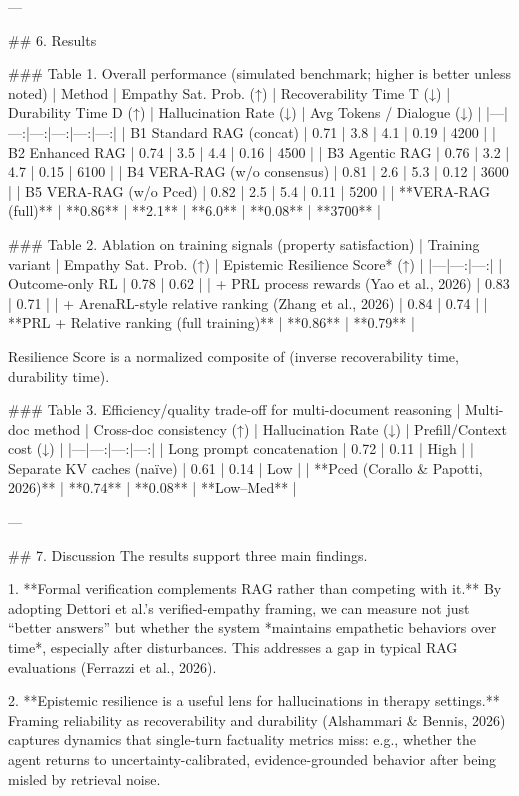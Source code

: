 ---

## 6. Results  

### Table 1. Overall performance (simulated benchmark; higher is better unless noted)  
| Method | Empathy Sat. Prob. (↑) | Recoverability Time T (↓) | Durability Time D (↑) | Hallucination Rate (↓) | Avg Tokens / Dialogue (↓) |
|---|---:|---:|---:|---:|---:|
| B1 Standard RAG (concat) | 0.71 | 3.8 | 4.1 | 0.19 | 4200 |
| B2 Enhanced RAG | 0.74 | 3.5 | 4.4 | 0.16 | 4500 |
| B3 Agentic RAG | 0.76 | 3.2 | 4.7 | 0.15 | 6100 |
| B4 VERA-RAG (w/o consensus) | 0.81 | 2.6 | 5.3 | 0.12 | 3600 |
| B5 VERA-RAG (w/o Pced) | 0.82 | 2.5 | 5.4 | 0.11 | 5200 |
| **VERA-RAG (full)** | **0.86** | **2.1** | **6.0** | **0.08** | **3700** |

### Table 2. Ablation on training signals (property satisfaction)  
| Training variant | Empathy Sat. Prob. (↑) | Epistemic Resilience Score* (↑) |
|---|---:|---:|
| Outcome-only RL | 0.78 | 0.62 |
| + PRL process rewards (Yao et al., 2026) | 0.83 | 0.71 |
| + ArenaRL-style relative ranking (Zhang et al., 2026) | 0.84 | 0.74 |
| **PRL + Relative ranking (full training)** | **0.86** | **0.79** |

\*Resilience Score is a normalized composite of (inverse recoverability time, durability time).

### Table 3. Efficiency/quality trade-off for multi-document reasoning  
| Multi-doc method | Cross-doc consistency (↑) | Hallucination Rate (↓) | Prefill/Context cost (↓) |
|---|---:|---:|---:|
| Long prompt concatenation | 0.72 | 0.11 | High |
| Separate KV caches (naïve) | 0.61 | 0.14 | Low |
| **Pced (Corallo & Papotti, 2026)** | **0.74** | **0.08** | **Low–Med** |

---

## 7. Discussion  
The results support three main findings.

1. **Formal verification complements RAG rather than competing with it.** By adopting Dettori et al.’s verified-empathy framing, we can measure not just “better answers” but whether the system *maintains empathetic behaviors over time*, especially after disturbances. This addresses a gap in typical RAG evaluations (Ferrazzi et al., 2026).

2. **Epistemic resilience is a useful lens for hallucinations in therapy settings.** Framing reliability as recoverability and durability (Alshammari & Bennis, 2026) captures dynamics that single-turn factuality metrics miss: e.g., whether the agent returns to uncertainty-calibrated, evidence-grounded behavior after being misled by retrieval noise.

